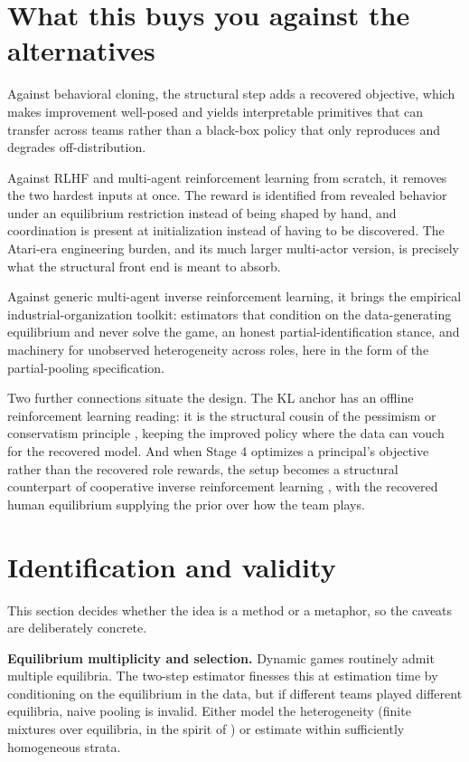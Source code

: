 \documentclass[11pt]{article}
\theoremstyle{definition}
\begin{document}
\section{What this buys you against the alternatives}

Against behavioral cloning, the structural step adds a recovered objective, which makes improvement well-posed and yields interpretable primitives that can transfer across teams rather than a black-box policy that only reproduces and degrades off-distribution.

Against RLHF and multi-agent reinforcement learning from scratch, it removes the two hardest inputs at once. The reward is identified from revealed behavior under an equilibrium restriction instead of being shaped by hand, and coordination is present at initialization instead of having to be discovered. The Atari-era engineering burden, and its much larger multi-actor version, is precisely what the structural front end is meant to absorb.

Against generic multi-agent inverse reinforcement learning, it brings the empirical industrial-organization toolkit: estimators that condition on the data-generating equilibrium and never solve the game, an honest partial-identification stance, and machinery for unobserved heterogeneity across roles, here in the form of the partial-pooling specification.

Two further connections situate the design. The KL anchor has an offline reinforcement learning reading: it is the structural cousin of the pessimism or conservatism principle \citep{kumar2020cql}, keeping the improved policy where the data can vouch for the recovered model. And when Stage 4 optimizes a principal's objective rather than the recovered role rewards, the setup becomes a structural counterpart of cooperative inverse reinforcement learning \citep{hadfieldMenell2016}, with the recovered human equilibrium supplying the prior over how the team plays.

\section{Identification and validity}

This section decides whether the idea is a method or a metaphor, so the caveats are deliberately concrete.

\textbf{Equilibrium multiplicity and selection.} Dynamic games routinely admit multiple equilibria. The two-step estimator finesses this at estimation time by conditioning on the equilibrium in the data, but if different teams played different equilibria, naive pooling is invalid. Either model the heterogeneity (finite mixtures over equilibria, in the spirit of \citealp{arcidiaconoMiller2011}) or estimate within sufficiently homogeneous strata.
\end{document}
